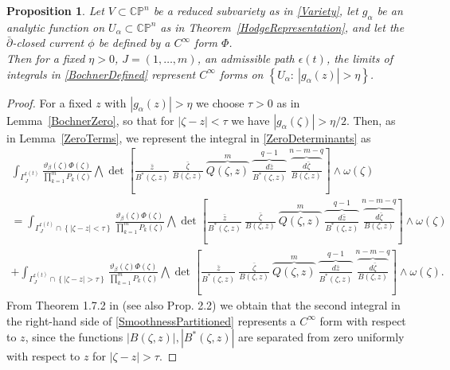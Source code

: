 \documentclass[11pt,reqno]{amsart}
\numberwithin{equation}{section}
\newtheorem{proposition}{Proposition}[section]
\begin{document}
\begin{proposition}\label{Smoothness} Let $V\subset {{\mathbb C}}{{\mathbb P}}^n$ be a reduced subvariety as in \eqref{Variety}, let $g_{\alpha}$ be an analytic function on $U_{\alpha}\subset {{\mathbb C}}{{\mathbb P}}^n$
as in Theorem~\ref{HodgeRepresentation}, and let the $\bar\partial$-closed current
$\phi$ be defined by a $C^{\infty}$ form $\Phi$.\\
\indent
Then for a fixed $\eta>0$, $J=(1,\dots,m)$, an admissible path $\epsilon(t)$,
the limits of integrals in \eqref{BochnerDefined} represent $C^{\infty}$ forms
on $\left\{U_{\alpha}:\ |g_{\alpha}(z)|>\eta \right\}$.
\end{proposition}
\begin{proof} For a fixed $z$ with $|g_{\alpha}(z)|>\eta$ we choose $\tau>0$ as in
Lemma~\ref{BochnerZero}, so that for
$|\zeta-z|<\tau$ we have $|g_{\alpha}(\zeta)|>\eta/2$. Then, as in Lemma~\ref{ZeroTerms}, we represent the integral in \eqref{ZeroDeterminants} as
\begin{multline}\label{SmoothnessPartitioned}
\int_{\Gamma^{\epsilon(t)}_J}
\frac{\vartheta_{\beta}(\zeta)\Phi(\zeta)}{\prod_{k=1}^mP_k(\zeta)}
\bigwedge\det\left[\frac{\bar z}{B^*(\zeta,z)}\ \frac{\bar\zeta}{B(\zeta,z)}\
\overbrace{Q(\zeta,z)}^{m}\
\overbrace{\frac{d{\bar z}}{B^*(\zeta,z)}}^{q-1}\
\overbrace{\frac{d{\bar\zeta}}{B(\zeta,z)}}^{n-m-q}\right]\wedge\omega(\zeta)\\
=\int_{\Gamma^{\epsilon(t)}_J\cap\left\{|\zeta-z|<\tau\right\}}
\frac{\vartheta_{\beta}(\zeta)\Phi(\zeta)}{\prod_{k=1}^mP_k(\zeta)}
\bigwedge\det\left[\frac{\bar z}{B^*(\zeta,z)}\ \frac{\bar\zeta}{B(\zeta,z)}\
\overbrace{Q(\zeta,z)}^{m}\
\overbrace{\frac{d{\bar z}}{B^*(\zeta,z)}}^{q-1}\
\overbrace{\frac{d{\bar\zeta}}{B(\zeta,z)}}^{n-m-q}\right]\wedge\omega(\zeta)\\
+\int_{\Gamma^{\epsilon(t)}_J\cap\left\{|\zeta-z|>\tau\right\}}
\frac{\vartheta_{\beta}(\zeta)\Phi(\zeta)}{\prod_{k=1}^mP_k(\zeta)}
\bigwedge\det\left[\frac{\bar z}{B^*(\zeta,z)}\ \frac{\bar\zeta}{B(\zeta,z)}\
\overbrace{Q(\zeta,z)}^{m}\
\overbrace{\frac{d{\bar z}}{B^*(\zeta,z)}}^{q-1}\
\overbrace{\frac{d{\bar\zeta}}{B(\zeta,z)}}^{n-m-q}\right]\wedge\omega(\zeta).
\end{multline}
\indent
From Theorem 1.7.2 in \cite{CH} (see also \cite{HP4} Prop. 2.2) we obtain that the second integral
in the right-hand side of \eqref{SmoothnessPartitioned} represents a $C^{\infty}$ form with respect to $z$,
since the functions $|B(\zeta,z)|, |B^*(\zeta,z)|$ are separated from zero uniformly with
respect to $z$ for $|\zeta-z|>\tau$.


\end{proof}
\end{document}
